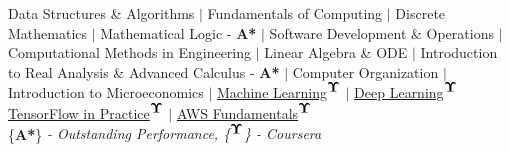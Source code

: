\documentclass[9pt]{article}
\newenvironment{changemargin}[2]{%
  \begin{list}{}{%
    \setlength{\topsep}{2pt}%
    \setlength{\leftmargin}{#1}%
    \setlength{\rightmargin}{#2}%
    \setlength{\listparindent}{\parindent}%
    \setlength{\itemindent}{\parindent}%
    \setlength{\parsep}{\parskip}%
  }%
  \item[]}{\end{list}
}
\newenvironment{body} {
	\vspace*{-16pt}
	\begin{changemargin}{-0.4in}{-0.5in}
  }	
	{\end{changemargin}
}
\begin{document}
\begin{body}
	\vspace{18pt}
Data Structures \& Algorithms $|$
Fundamentals of Computing $|$
Discrete Mathematics $|$
Mathematical Logic - \textbf{A*} $|$
Software Development \& Operations $|$
Computational Methods in Engineering $|$
Linear Algebra \& ODE $|$
Introduction to Real Analysis \& Advanced Calculus - \textbf{A*} $|$
Computer Organization $|$
Introduction to Microeconomics $|$
\href{https://www.coursera.org/account/accomplishments/certificate/WVYY4U3DKVBM}{Machine Learning}\textsuperscript{${\bf\Upsilon}$} $|$
\href{https://www.coursera.org/account/accomplishments/specialization/certificate/SMFFBZ7XFK3H}{Deep Learning}\textsuperscript{${\bf\Upsilon}$}
\href{https://www.coursera.org/account/accomplishments/specialization/certificate/BM37DELH9GNV}{TensorFlow in Practice}\textsuperscript{${\bf\Upsilon}$} $|$
\href{https://www.coursera.org/account/accomplishments/specialization/certificate/UBNWKPPAQSLE}{AWS Fundamentals}\textsuperscript{${\bf\Upsilon}$}\\
\vspace{-7pt}
\hfill\{\textbf{A*}\}\textit{ - Outstanding Performance, \{\textsuperscript{${\bf\Upsilon}$}\} - Coursera}



\end{body}
\vspace{-10pt}
\end{document}
